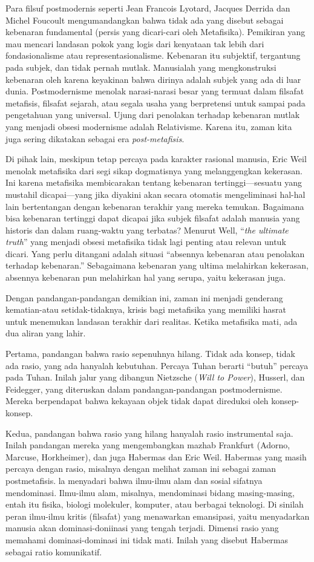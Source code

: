\documentclass[10pt,a4paper]{article}
\begin{document}
\begin{multicols}{2}
Para filsuf postmodernis seperti Jean Francois Lyotard, Jacques Derrida
dan Michel Foucoult mengumandangkan bahwa tidak ada yang disebut sebagai
kebenaran fundamental (persis yang dicari-cari oleh Metafisika).
Pemikiran yang mau mencari landasan pokok yang logis dari kenyataan tak
lebih dari fondasionalisme atau representasionalisme. Kebenaran itu
subjektif, tergantung pada subjek, dan tidak pernah mutlak. Manusialah
yang mengkonstruksi kebenaran oleh karena keyakinan bahwa dirinya adalah
subjek yang ada di luar dunia. Postmodernisme menolak narasi-narasi
besar yang termuat dalam filsafat metafisis, filsafat sejarah, atau
segala usaha yang berpretensi untuk sampai pada pengetahuan yang
universal. Ujung dari penolakan terhadap kebenaran mutlak yang menjadi
obsesi modernisme adalah Relativisme. Karena itu, zaman kita juga sering
dikatakan sebagai era \emph{post-metafisis}.

Di pihak lain, meskipun tetap percaya pada karakter rasional manusia,
Eric Weil menolak metafisika dari segi sikap dogmatisnya yang
melanggengkan kekerasan. Ini karena metafisika membicarakan tentang
kebenaran tertinggi---sesuatu yang mustahil dicapai---yang jika diyakini
akan secara otomatis mengeliminasi hal-hal lain bertentangan dengan
kebenaran terakhir yang mereka temukan. Bagaimana bisa kebenaran
tertinggi dapat dicapai jika subjek filsafat adalah manusia yang
historis dan dalam ruang-waktu yang terbatas? Menurut Well, ``\emph{the
ultimate truth}'' yang menjadi obsesi metafisika tidak lagi penting atau
relevan untuk dicari. Yang perlu ditangani adalah situasi ``absennya
kebenaran atau penolakan terhadap kebenaran.'' Sebagaimana kebenaran
yang ultima melahirkan kekerasan, absennya kebenaran pun melahirkan hal
yang serupa, yaitu kekerasan juga.

Dengan pandangan-pandangan demikian ini, zaman ini menjadi genderang
kematian-atau setidak-tidaknya, krisis bagi metafisika yang memiliki
hasrat untuk menemukan landasan terakhir dari realitas. Ketika
metafisika mati, ada dua aliran yang lahir.

Pertama, pandangan bahwa rasio sepenuhnya hilang. Tidak ada konsep,
tidak ada rasio, yang ada hanyalah kebutuhan. Percaya Tuhan berarti
``butuh'' percaya pada Tuhan. Inilah jalur yang dibangun Nietzsche
(\emph{Will to Power}), Husserl, dan Feidegger, yang diteruskan dalam
pandangan-pandangan postmodernisme. Mereka berpendapat bahwa kekayaan
objek tidak dapat direduksi oleh konsep-konsep.

Kedua, pandangan bahwa rasio yang hilang hanyalah rasio instrumental
saja. Inilah pandangan mereka yang mengembangkan mazhab Frankfurt
(Adorno, Marcuse, Horkheimer), dan juga Habermas dan Eric Weil. Habermas
yang masih percaya dengan rasio, misalnya dengan melihat zaman ini
sebagai zaman postmetafisis. la menyadari bahwa ilmu-ilmu alam dan
sosial sifatnya mendominasi. Ilmu-ilmu alam, misalnya, mendominasi
bidang masing-masing, entah itu fisika, biologi molekuler, komputer,
atau berbagai teknologi. Di sinilah peran ilmu-ilmu kritis (filsafat)
yang menawarkan emansipasi, yaitu menyadarkan manusia akan
dominasi-doniinasi yang tengah terjadi. Dimensi rasio yang memahami
dominasi-dominasi ini tidak mati. Inilah yang disebut Habermas sebagai
ratio komunikatif.


\end{multicols}
\end{document}
